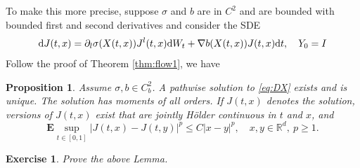 \documentclass[twoside, 12pt]{book}
\numberwithin{equation}{chapter}
\newtheorem{proposition}[theorem]{Proposition}
\newtheorem{exercise}{Exercise}[section]
\def\mR{{\mathbb R}}
\def\bE{{\mathbf E}}
\def\l{\left}
\def\r{\right}
\def\geq{\geqslant}
\def\leq{\leqslant}
\def\d{\text{\rm{d}}}
\begin{document}
    To make this more precise, suppose $\sigma$ and $b$ are in $C^2$ and are bounded with bounded first and second derivatives and consider the SDE 
    \begin{equation}\label{eq:DX}
        \d J(t,x)=\partial_l\sigma(X(t,x)) J^l(t,x) \d W_t+\nabla b(X(t,x)) J(t,x) \d t, \quad Y_0=I
    \end{equation}
    Follow the proof of Theorem \ref{thm:flow1}, we have 
    \begin{proposition}\label{prop:Jacobi}
    Assume $\sigma, b\in C^2_b$. A pathwise solution to \eqref{eq:DX} exists and is unique. The solution has moments of all orders. If $J(t,x)$ denotes the solution, versions of $J(t,x)$ exist that are jointly Hölder continuous in $t$ and $x$, and 
        \[
          \bE \sup_{t\in[0,1]}\l|J(t,x)-J(t,y)\r|^p\leq C |x-y|^p, \quad x,y\in \mR^d,~p\geq 1.
       \]    
    \end{proposition}
    
\begin{exercise}
    Prove the above Lemma. 
\end{exercise}
\end{document}
